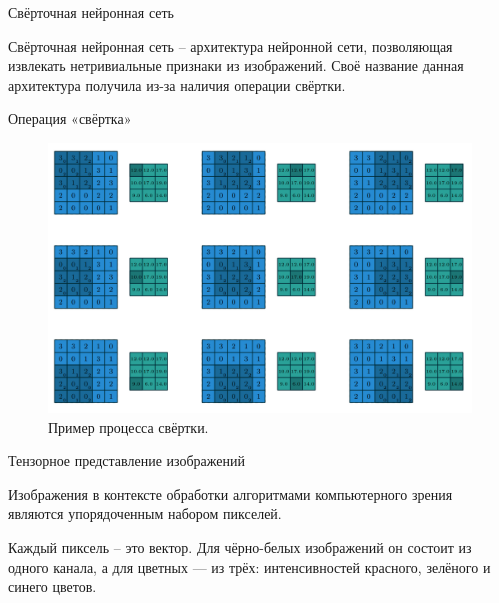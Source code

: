 \documentclass{beamer}
\begin{document}
\begin{frame}{Свёрточная нейронная сеть}

	\alert{Свёрточная нейронная сеть} -- архитектура нейронной сети, позволяющая извлекать нетривиальные признаки из изображений. Своё название данная архитектура получила из-за наличия операции свёртки.



\end{frame}

\begin{frame}{Операция «свёртка»}

\begin{figure}[H]
		\centering
		\begin{minipage}[t]{.75\textwidth}
			\centering
			\includegraphics[width=\linewidth]{./img/svertka.png}
		\end{minipage}
		\caption{Пример процесса свёртки.}
	\end{figure}

\end{frame}

\begin{frame}{Тензорное представление изображений}

        \alert{Изображения} в контексте обработки алгоритмами компьютерного зрения являются упорядоченным набором пикселей. 

        \alert{Каждый пиксель} -- это вектор. Для чёрно-белых изображений он состоит из одного канала, а для цветных — из трёх: интенсивностей красного, зелёного и синего цветов.



\end{frame}
\end{document}
